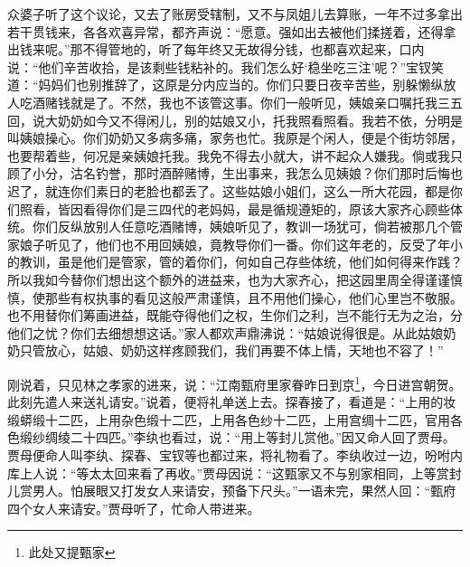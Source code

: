 \documentclass[12pt,oneside]{book}
\begin{document}
众婆子听了这个议论，又去了账房受辖制，又不与凤姐儿去算账，一年不过多拿出若干贯钱来，各各欢喜异常，都齐声说：“愿意。强如出去被他们揉搓着，还得拿出钱来呢。”那不得管地的，听了每年终又无故得分钱，也都喜欢起来，口内说：“他们辛苦收拾，是该剩些钱粘补的。我们怎么好‘稳坐吃三注’呢？”宝钗笑道：“妈妈们也别推辞了，这原是分内应当的。你们只要日夜辛苦些，别躲懒纵放人吃酒赌钱就是了。不然，我也不该管这事。你们一般听见，姨娘亲口嘱托我三五回，说大奶奶如今又不得闲儿，别的姑娘又小，托我照看照看。我若不依，分明是叫姨娘操心。你们奶奶又多病多痛，家务也忙。我原是个闲人，便是个街坊邻居，也要帮着些，何况是亲姨娘托我。我免不得去小就大，讲不起众人嫌我。倘或我只顾了小分，沽名钓誉，那时酒醉赌博，生出事来，我怎么见姨娘？你们那时后悔也迟了，就连你们素日的老脸也都丢了。这些姑娘小姐们，这么一所大花园，都是你们照看，皆因看得你们是三四代的老妈妈，最是循规遵矩的，原该大家齐心顾些体统。你们反纵放别人任意吃酒赌博，姨娘听见了，教训一场犹可，倘若被那几个管家娘子听见了，他们也不用回姨娘，竟教导你们一番。你们这年老的，反受了年小的教训，虽是他们是管家，管的着你们，何如自己存些体统，他们如何得来作践？所以我如今替你们想出这个额外的进益来，也为大家齐心，把这园里周全得谨谨慎慎，使那些有权执事的看见这般严肃谨慎，且不用他们操心，他们心里岂不敬服。也不用替你们筹画进益，既能夺得他们之权，生你们之利，岂不能行无为之治，分他们之忧？你们去细想想这话。”家人都欢声鼎沸说：“姑娘说得很是。从此姑娘奶奶只管放心，姑娘、奶奶这样疼顾我们，我们再要不体上情，天地也不容了！”

刚说着，只见林之孝家的进来，说：“江南甄府里家眷昨日到京\footnote{此处又提甄家}，今日进宫朝贺。此刻先遣人来送礼请安。”说着，便将礼单送上去。探春接了，看道是：“上用的妆缎蟒缎十二匹，上用杂色缎十二匹，上用各色纱十二匹，上用宫绸十二匹，官用各色缎纱绸绫二十四匹。”李纨也看过，说：“用上等封儿赏他。”因又命人回了贾母。贾母便命人叫李纨、探春、宝钗等也都过来，将礼物看了。李纨收过一边，吩咐内库上人说：“等太太回来看了再收。”贾母因说：“这甄家又不与别家相同，上等赏封儿赏男人。怕展眼又打发女人来请安，预备下尺头。”一语未完，果然人回：“甄府四个女人来请安。”贾母听了，忙命人带进来。
\end{document}
